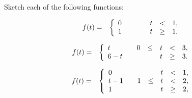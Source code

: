 \begin{problem}
\item Sketch each of the following functions:

  \begin{subproblem}
  \item 
    \begin{eqnarray}
      f(t) & = & \left\{
        \begin{array}{l@{\hspace{2em}}rcccl}
          0 &    &  & t & < & 1, \\
          1 &    &  & t & \geq & 1. \\
        \end{array}
      \right.
    \end{eqnarray}
    \vfill

  \item 
    \begin{eqnarray}
      f(t) & = & \left\{
        \begin{array}{l@{\hspace{2em}}rcccl}
          t & 0 & \leq & t & < & 3, \\
          6-t &  &     & t & \geq & 3. \\
        \end{array}
      \right.
    \end{eqnarray}
    \vfill

  \item 
    \begin{eqnarray}
      f(t) & = & \left\{
        \begin{array}{l@{\hspace{2em}}rcccl}
          0   &    &  & t & < & 1, \\
          t-1 &  1 & \leq & t & < & 2, \\
          1   &    &      & t & \geq & 2, \\
        \end{array}
      \right.
    \end{eqnarray}
    \vfill

  \end{subproblem}

\end{problem}

